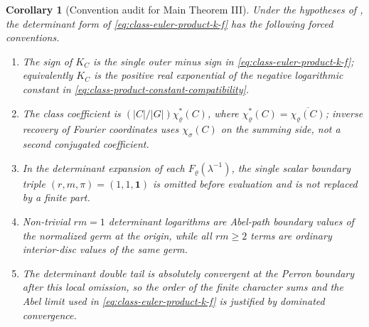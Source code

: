 \documentclass[11pt,a4paper]{amsart}
\theoremstyle{plain}
\newtheorem{corollary}[theorem]{Corollary}
\theoremstyle{definition}
\theoremstyle{remark}
\begin{document}
\begin{corollary}[Convention audit for Main Theorem III]
  \label{cor:main-iii-convention-audit}
  Under the hypotheses of , the
  determinant form of \eqref{eq:class-euler-product-k-f} has the following
  forced conventions.
  \begin{enumerate}[label=\textup{(\roman*)}]
    \item The sign of \(K_C\) is the single outer minus sign in
    \eqref{eq:class-euler-product-k-f}; equivalently \(K_C\) is the
    positive real exponential of the negative logarithmic constant in
    \eqref{eq:class-product-constant-compatibility}.
    \item The class coefficient is
    \((|C|/|G|)\chi_\varrho^\ast(C)\), where
    \(\chi_\varrho^\ast(C)=\overline{\chi_\varrho(C)}\); inverse recovery of
    Fourier coordinates uses \(\chi_\sigma(C)\) on the summing side, not a
    second conjugated coefficient.
    \item In the determinant expansion of each
    \(F_\varrho(\lambda^{-1})\), the single scalar boundary triple
    \((r,m,\pi)=(1,1,\mathbf1)\) is omitted before evaluation and is not
    replaced by a finite part.
    \item Non-trivial \(rm=1\) determinant logarithms are Abel-path boundary
    values of the normalized germ at the origin, while all \(rm\ge2\) terms
    are ordinary interior-disc values of the same germ.
    \item The determinant double tail is absolutely convergent at the Perron
    boundary after this local omission, so the order of the finite character
    sums and the Abel limit used in \eqref{eq:class-euler-product-k-f} is
    justified by dominated convergence.
  \end{enumerate}
\end{corollary}
\end{document}
